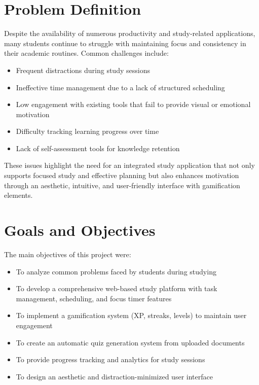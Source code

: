         \section{Problem Definition}
        Despite the availability of numerous productivity and study-related applications, many students continue to struggle with maintaining focus and consistency in their academic routines. Common challenges include:
        \begin{itemize}
            \item Frequent distractions during study sessions
            \item Ineffective time management due to a lack of structured scheduling
            \item Low engagement with existing tools that fail to provide visual or emotional motivation
            \item Difficulty tracking learning progress over time
            \item Lack of self-assessment tools for knowledge retention
        \end{itemize}
        These issues highlight the need for an integrated study application that not only supports focused study and effective planning but also enhances motivation through an aesthetic, intuitive, and user-friendly interface with gamification elements.

        \section{Goals and Objectives}
            The main objectives of this project were:
            \begin{itemize}
                \item To analyze common problems faced by students during studying
                \item To develop a comprehensive web-based study platform with task management, scheduling, and focus timer features
                \item To implement a gamification system (XP, streaks, levels) to maintain user engagement
                \item To create an automatic quiz generation system from uploaded documents
                \item To provide progress tracking and analytics for study sessions
                \item To design an aesthetic and distraction-minimized user interface
            \end{itemize}

